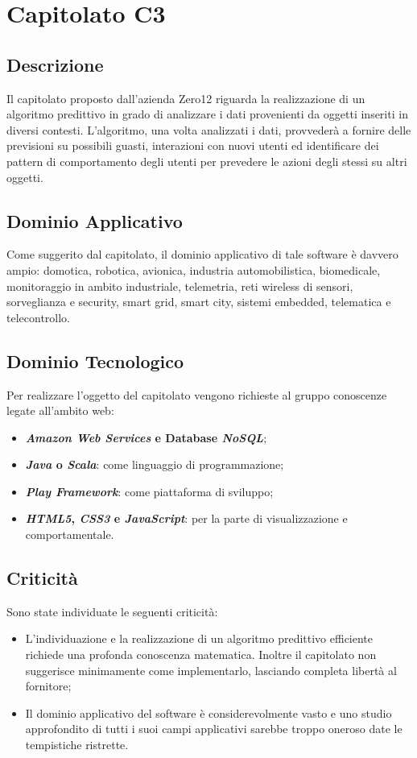 \newpage
\section{Capitolato C3}
\subsection{Descrizione}
Il capitolato proposto dall'azienda Zero12 riguarda la realizzazione di un algoritmo predittivo in grado di analizzare i dati provenienti da oggetti inseriti in diversi contesti. L'algoritmo, una volta analizzati i dati, provvederà a fornire delle previsioni su possibili guasti, interazioni con nuovi utenti ed identificare dei pattern di comportamento degli utenti per prevedere le azioni degli stessi su altri oggetti.

\subsection{Dominio Applicativo}
Come suggerito dal capitolato, il dominio applicativo di tale software è davvero ampio: domotica, robotica, avionica, industria automobilistica, biomedicale, monitoraggio in ambito industriale, telemetria, reti wireless di sensori, sorveglianza e security, smart grid, smart city, sistemi embedded, telematica e telecontrollo.

\subsection{Dominio Tecnologico}
Per realizzare l'oggetto del capitolato vengono richieste al gruppo conoscenze legate all'ambito web:
\begin{itemize}
\item \textbf{\textit{Amazon Web Services} e Database \textit{ NoSQL}};
\item \textbf{\textit{Java} o \textit{Scala}}: come linguaggio di programmazione;
\item \textbf{\textit{Play Framework}}: come piattaforma di sviluppo;
\item \textbf{\textit{HTML5}, \textit{CSS3} e \textit{JavaScript}}: per la parte di visualizzazione e comportamentale.
\end{itemize}

\subsection{Criticità}
Sono state individuate le seguenti criticità:
\begin{itemize}
\item L'individuazione e la realizzazione di un algoritmo predittivo efficiente richiede una profonda conoscenza matematica. Inoltre il capitolato non suggerisce minimamente come implementarlo, lasciando completa libertà al fornitore;
\item Il dominio applicativo del software è considerevolmente vasto e uno studio approfondito di tutti i suoi campi applicativi sarebbe troppo oneroso date le tempistiche ristrette.
\end{itemize}

